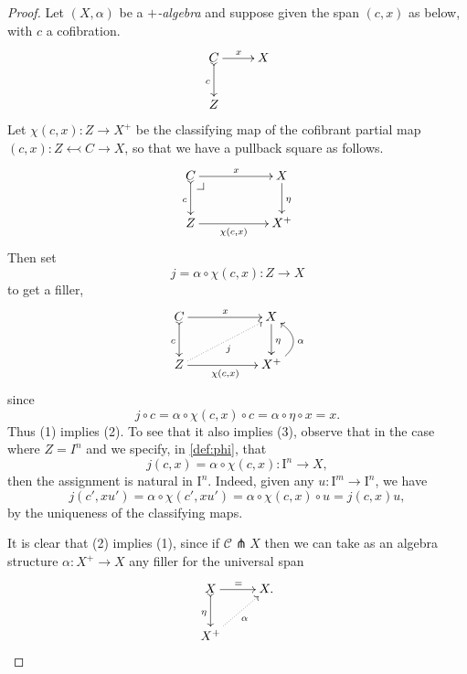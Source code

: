 \documentclass[11pt]{amsart}
\makeatletter
\newcommand{\ra}{\ensuremath{\rightarrow}}
\renewcommand{\to}{\ensuremath{\rightarrow}}
\newcommand{\I}{\ensuremath{\mathrm{I}}}
\theoremstyle{remark}
\theoremstyle{definition}
\newcommand{\pbcorner}[1][dr]{\save*!/#1-1.2pc/#1:(-1,1)@^{|-}\restore}
\makeatother
\begin{document}
\begin{proof}
Let $(X, \alpha)$ be a \emph{$+$-algebra} and suppose given the span $(c,x)$ as below, with $c$ a cofibration. 
\begin{equation*}%
\xymatrix{
C \ar@{>->}[d]_{c} \ar[r]^{x} & X \\
Z &
}
\end{equation*}
Let $\chi(c,x): Z\ra X^+$ be the classifying map of the cofibrant partial map $(c,x) : Z \leftarrowtail C \to X$, so that we have a pullback square as follows.
\begin{equation}\label{diagram:defphi}
\xymatrix{
C \ar@{>->}[d]_{c} \ar[rr]^{x} \pbcorner && X \ar[d]^{\eta} \\
Z \ar[rr]_-{\chi(c,x)} && X^+
}
\end{equation}
Then set
\begin{equation}\label{def:phi}
j = \alpha\circ\chi(c,x) : Z\ra X
\end{equation}
to get a filler,
\begin{equation}\label{diagram:defphi}
\xymatrix{
C \ar@{>->}[d]_{c} \ar[rr]^{x} && X \ar[d]^{\eta} \\
Z\ar@{.>}[rru]_{j} \ar[rr]_{\chi(c,x)} && X^+  \ar@/_4ex/ [u]_\alpha
}
\end{equation}
since $$j\circ c = \alpha\circ\chi(c,x)\circ c = \alpha\circ\eta \circ x = x.$$ Thus (1) implies (2).  To see that it also implies (3), observe that in the case where $Z=I^n$ and we specify, in \eqref{def:phi}, that
\begin{equation}\label{def:j}
j(c,x) = \alpha\circ\chi(c,x) : \I^n\ra X,
\end{equation}
then the assignment is natural in $\I^n$. Indeed,  given any $u : \I^m \ra \I^n$, we have
\begin{equation}\label{eq:proof,uniformfillers}
j(c',xu') = \alpha\circ\chi(c',xu') = \alpha\circ\chi(c,x)\circ u = j(c,x) u,
\end{equation}
by the uniqueness of the classifying maps.

It is clear that (2) implies (1), since if $\mathcal{C} \pitchfork X$ then we can take as an algebra structure $\alpha : X^+ \ra X$ any filler for the universal span
\[
\xymatrix{
X \ar@{>->}[d]_{\eta} \ar[r]^{=} & X .\\
X^+ \ar@{.>}[ru]_\alpha&
}
\]


\end{proof}
\end{document}
